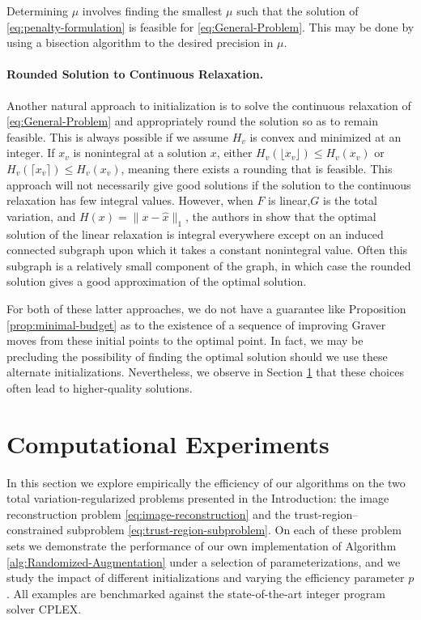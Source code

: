 \documentclass[pdflatex,sn-mathphys-num]{sn-jnl}%
\begin{document}
Determining $\mu$ involves finding the smallest $\mu$ such that the solution of \eqref{eq:penalty-formulation} is feasible for \eqref{eq:General-Problem}. This may be done by using a bisection algorithm to the desired precision in $\mu$.

\paragraph{Rounded Solution to Continuous Relaxation.}
Another natural approach to initialization is to solve the continuous relaxation of \eqref{eq:General-Problem} and appropriately round the solution so as to remain feasible. 
This is always possible if we assume $H_v$ is convex and minimized at an integer.  If $x_v$ is nonintegral at a solution $x$, either $H_v(\lfloor x_v \rfloor) \le H_v(x_v)$ or $H_v(\lceil x_v \rceil) \le H_v(x_v)$, meaning there exists a rounding that is feasible. 
This approach will not necessarily give good solutions if the solution to the continuous relaxation has few integral values. However, when $F$ is linear,$G$ is the total variation, and $H(x) = \|x - \hat{x}\|_1$, the authors in \cite{manns2024discrete} show that the optimal solution of the linear relaxation is integral everywhere except on an induced connected subgraph upon which it takes a constant nonintegral value. Often this subgraph is a relatively small component of the graph, in which case the rounded solution gives a good approximation of the optimal solution.

For both of these latter approaches, we do not have a guarantee like Proposition \ref{prop:minimal-budget} as to the existence of a sequence of improving Graver moves from these initial points to the optimal point. In fact, we may be precluding the possibility of finding the optimal solution should we use these alternate initializations. Nevertheless, we observe in Section \ref{sec:experiments} that these choices  often lead to higher-quality solutions.

\section{Computational Experiments}
\label{sec:experiments}
In this section we explore empirically the efficiency of our algorithms on the two total variation-regularized problems presented in the Introduction: the image reconstruction problem \eqref{eq:image-reconstruction} and the trust-region--constrained subproblem \eqref{eq:trust-region-subproblem}. On each of these problem sets we demonstrate the performance of our own implementation of Algorithm \ref{alg:Randomized-Augmentation} under a selection of parameterizations, and we study the impact of different initializations and varying the efficiency parameter $p$. All examples are benchmarked against the state-of-the-art integer program solver CPLEX.
\end{document}
